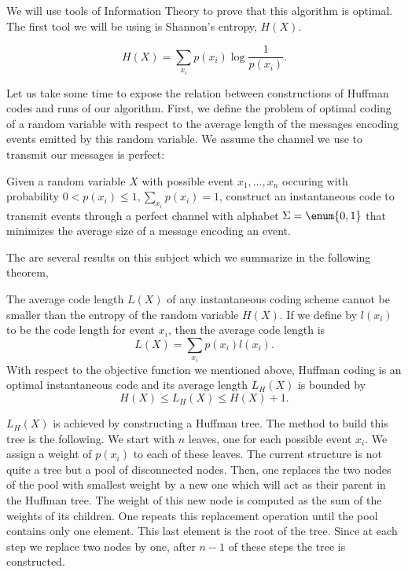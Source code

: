 We will use tools of Information Theory to prove that this algorithm is
optimal. The first tool we will be using is Shannon's entropy, \(H(X)\).
\begin{theorem}
\begin{displaymath}
H(X) = \sum_{x_i} p(x_i) \log \frac{1}{p(x_i)}.
\end{displaymath}
\end{theorem}

Let us take some time to expose the relation between constructions of Huffman
codes and runs of our algorithm. First, we define the problem of optimal
coding of a random variable with respect to the average length of the messages
encoding events emitted by this random variable. We assume the channel we
use to transmit our messages is perfect:

\begin{problem}
Given a random variable \(X\) with possible event \(x_1,\ldots,x_n\) occuring
with probability \(0 < p(x_i) \le 1, \sum_{x_i} p(x_i) = 1\), construct an
instantaneous code to transmit events through a perfect channel with alphabet
\(\Sigma = \enum{0,1}\) that minimizes the average size of a message encoding
an event.
\end{problem}

The are several results on this subject which we summarize in the
following theorem,

\begin{theorem}
The average code length \(L(X)\) of any instantaneous coding scheme cannot be smaller than
the entropy of the random variable \(H(X)\). If we define by \(l(x_i)\) to be the code
length for event \(x_i\), then the average code length is
\begin{displaymath}
L(X) = \sum_{x_i} p(x_i) l(x_i).
\end{displaymath}
With respect to the objective function we mentioned above, Huffman coding is
an optimal instantaneous code and its average length \(L_H(X)\) is bounded by
\begin{displaymath}
H(X) \le L_H(X) \le H(X) + 1.
\end{displaymath}
\end{theorem}

\(L_H(X)\) is achieved by constructing a Huffman tree. The method to build this
tree is the following. We start with \(n\) leaves, one for each possible event
\(x_i\). We assign a weight of \(p(x_i)\) to each of these leaves. The current
structure is not quite a tree but a pool of disconnected nodes.  Then, one
replaces the two nodes of the pool with smallest weight by a new one which will
act as their parent in the Huffman tree. The weight of this new node is
computed as the sum of the weights of its children. One repeats this
replacement operation until the pool contains only one element. This last
element is the root of the tree. Since at each step we replace two nodes by
one, after \(n-1\) of these steps the tree is constructed.

